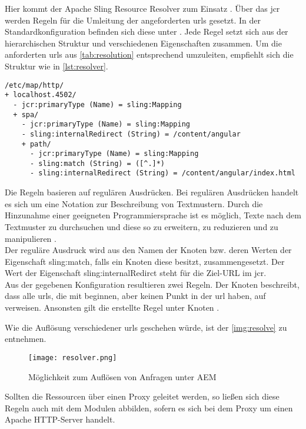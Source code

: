 Hier kommt der Apache Sling Resource Resolver zum Einsatz \cite{Foundation2016}. Über das \ac{jcr} werden Regeln für die Umleitung der angeforderten \ac{url}s gesetzt. In der Standardkonfiguration befinden sich diese unter . Jede Regel setzt sich aus der hierarchischen Struktur und verschiedenen Eigenschaften zusammen. Um die anforderten \ac{url}s aus \autoref{tab:resolution} entsprechend umzuleiten, empfiehlt sich die Struktur wie in \autoref{lst:resolver}.

\begin{lstlisting}[style=jcr,caption=Konfigurationsbeispiel für den Apache Sling Resource Resolver, label=lst:resolver]
/etc/map/http/
+ localhost.4502/
  - jcr:primaryType (Name) = sling:Mapping
  + spa/
    - jcr:primaryType (Name) = sling:Mapping
    - sling:internalRedirect (String) = /content/angular
    + path/
      - jcr:primaryType (Name) = sling:Mapping
      - sling:match (String) = ([^.]*)
      - sling:internalRedirect (String) = /content/angular/index.html
\end{lstlisting}

Die Regeln basieren auf regulären Ausdrücken. Bei regulären Ausdrücken handelt es sich um eine Notation zur Beschreibung von Textmustern. Durch die Hinzunahme einer geeigneten Programmiersprache ist es möglich, Texte nach dem Textmuster zu durchsuchen und diese so zu erweitern, zu reduzieren und zu manipulieren \cite[S. 1 f.]{Friedl2009}. \\
Der reguläre Ausdruck wird aus den Namen der Knoten bzw. deren Werten der Eigenschaft sling:match, falls ein Knoten diese besitzt, zusammengesetzt. Der Wert der Eigenschaft sling:internalRedirct steht für die Ziel-URL im \ac{jcr}. \\
Aus der gegebenen Konfiguration resultieren zwei Regeln. Der Knoten  beschreibt, dass alle \ac{url}s, die mit  beginnen, aber keinen Punkt in der \ac{url} haben, auf  verweisen. Ansonsten gilt die erstellte Regel unter Knoten .

Wie die Auflösung verschiedener \ac{url}s geschehen würde, ist der \autoref{img:resolve} zu entnehmen.

\begin{figure}[H]
	\begin{center}
		\texttt{[image: resolver.png]}
		\caption{Möglichkeit zum Auflösen von Anfragen unter AEM}
		\label{img:resolve}
	\end{center}
\end{figure}

Sollten die Ressourcen über einen Proxy geleitet werden, so ließen sich diese Regeln auch mit dem Modulen  abbilden, sofern es sich bei dem Proxy um einen Apache HTTP-Server handelt.
